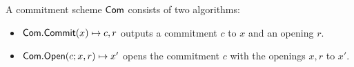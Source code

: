 %
%





\begin{definition}
	A commitment scheme $ \mathsf{Com} $ consists of two algorithms:
	\begin{itemize}
		\item $ \mathsf{Com}.\mathsf{Commit}(x) \mapsto c,r$ outputs a commitment $ c $ to $ x $ and  an opening $ r $.
		\item $ \mathsf{Com}.\mathsf{Open}(c;x,r)  \mapsto x'$ opens the commitment $ c $ with the openings $ x,r$ to $ x' $. 
	\end{itemize}
\end{definition}